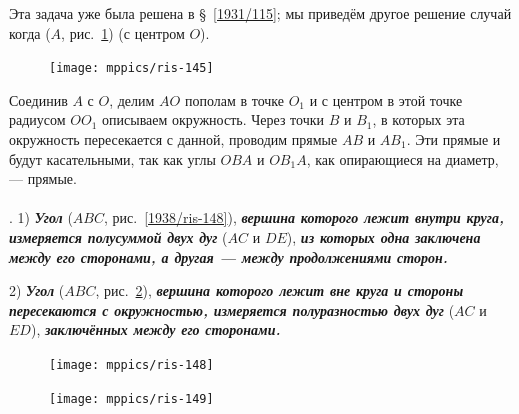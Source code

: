 \documentclass[twoside]{book}
\begin{document}
Эта задача уже  была решена в §~\ref{1931/115};
мы приведём другое решение случай когда  ($A$, рис.~\ref{1938/ris-145})  (с центром $O$).

\begin{figure}
\centering
\texttt{[image: mppics/ris-145]}
\caption{}\label{1938/ris-145}
\end{figure}

Соединив $A$ с $O$, делим $AO$ пополам в точке $O_1$ и с центром в этой точке радиусом $OO_1$ описываем окружность.
Через точки $B$ и $B_1$, в которых эта окружность пересекается с данной, проводим прямые $AB$ и $AB_1$.
Эти прямые и будут касательными, так как углы $OBA$ и $OB_1A$, как опирающиеся на диаметр, — прямые.




\paragraph{}\label{1938/130}
.
1) \textbf{\emph{Угол}} ($ABC$, рис.~\ref{1938/ris-148}), \textbf{\emph{вершина которого лежит внутри круга, измеряется полусуммой двух дуг}} ($AC$ и $DE$), \textbf{\emph{из которых одна заключена между его сторонами, а другая — между продолжениями сторон.}}

2) \textbf{\emph{Угол}} ($ABC$, рис.~\ref{1938/ris-149}), \textbf{\emph{вершина которого лежит вне круга и стороны пересекаются с окружностью, измеряется полуразностью двух дуг}} ($AC$ и $ED$), \textbf{\emph{заключённых между его сторонами.}}

\begin{figure}[h]
\begin{minipage}{.48\textwidth}
\centering
\texttt{[image: mppics/ris-148]}
\end{minipage}
\hfill
\begin{minipage}{.48\textwidth}
\centering
\texttt{[image: mppics/ris-149]}
\end{minipage}

\medskip

\begin{minipage}{.48\textwidth}
\centering
\caption{}\label{1938/ris-148}
\end{minipage}
\hfill
\begin{minipage}{.48\textwidth}
\centering
\caption{}\label{1938/ris-149}
\end{minipage}
\vskip-4mm
\end{figure}
\end{document}
